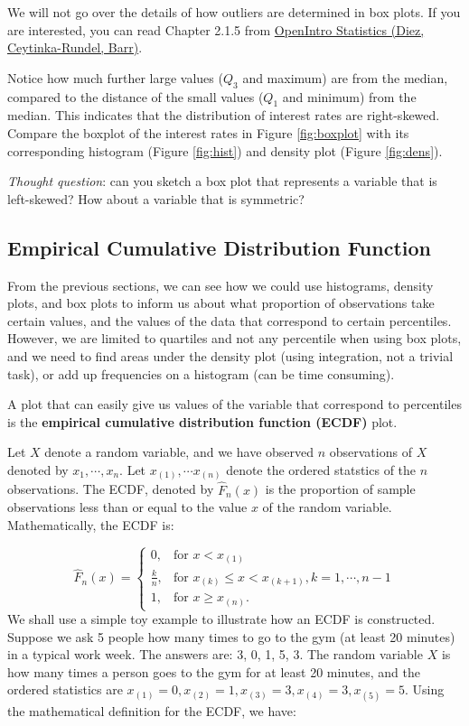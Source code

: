 \documentclass[
]{book}
\begin{document}
We will not go over the details of how outliers are determined in box plots. If you are interested, you can read Chapter 2.1.5 from \href{https://www.openintro.org/book/os/}{OpenIntro Statistics (Diez, Ceytinka-Rundel, Barr)}.

Notice how much further large values (\(Q_3\) and maximum) are from the median, compared to the distance of the small values (\(Q_1\) and minimum) from the median. This indicates that the distribution of interest rates are right-skewed. Compare the boxplot of the interest rates in Figure \ref{fig:boxplot} with its corresponding histogram (Figure \ref{fig:hist}) and density plot (Figure \ref{fig:dens}).

\emph{Thought question}: can you sketch a box plot that represents a variable that is left-skewed? How about a variable that is symmetric?

\subsection{Empirical Cumulative Distribution Function}\label{ecdf}

From the previous sections, we can see how we could use histograms, density plots, and box plots to inform us about what proportion of observations take certain values, and the values of the data that correspond to certain percentiles. However, we are limited to quartiles and not any percentile when using box plots, and we need to find areas under the density plot (using integration, not a trivial task), or add up frequencies on a histogram (can be time consuming).

A plot that can easily give us values of the variable that correspond to percentiles is the \textbf{empirical cumulative distribution function (ECDF)} plot.

Let \(X\) denote a random variable, and we have observed \(n\) observations of \(X\) denoted by \(x_1, \cdots, x_n\). Let \(x_{(1)}, \cdots x_{(n)}\) denote the ordered statstics of the \(n\) observations. The ECDF, denoted by \(\hat{F}_n(x)\) is the proportion of sample observations less than or equal to the value \(x\) of the random variable. Mathematically, the ECDF is:

\[
 \hat{F}_n(x) = 
  \begin{cases} 
   0, & \text{for } x < x_{(1)} \\
   \frac{k}{n},       & \text{for } x_{(k)} \leq x < x_{(k+1)}, k = 1, \cdots, n-1\\
   1, & \text{for } x \geq x_{(n)}.
  \end{cases}
\]
We shall use a simple toy example to illustrate how an ECDF is constructed. Suppose we ask 5 people how many times to go to the gym (at least 20 minutes) in a typical work week. The answers are: 3, 0, 1, 5, 3. The random variable \(X\) is how many times a person goes to the gym for at least 20 minutes, and the ordered statistics are \(x_{(1)} = 0, x_{(2)} = 1, x_{(3)} = 3, x_{(4)} = 3, x_{(5)} = 5\). Using the mathematical definition for the ECDF, we have:
\end{document}
